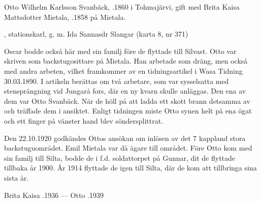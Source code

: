 Otto Wilhelm Karlsson Svanbäck, .1860 i Tohmajärvi, gift med Brita Kaisa Mattsdotter Mietala, .1858 på Mietala.
\begin{jhchildren}
  \item {}
  \item {}
  \item {}
  \item {}
  \item {}, stationskarl, g. m. Ida Sannasdr Slangar (karta 8, nr 371)
  \item {}
  \item {}
  \item {}
  \item {}
\end{jhchildren}

Oscar bodde också här med sin familj före de flyttade till Silvast. Otto var skriven som backstugosittare på Mietala. Han arbetade som dräng, men också med andra arbeten, vilket framkommer av en tidningsartikel i Wasa Tidning 30.03.1890. I artikeln berättas om två arbetare, som var sysselsatta med stensprängning vid Jungarå fors, där en ny kvarn skulle anläggas. Den ena av dem var Otto Svanbäck. När de höll på att ladda ett skott brann detsamma av och träffade dem i ansiktet. Enligt tidningen miste Otto synen helt på ena ögat och ett finger på vänster hand blev söndersplittrat.

Den 22.10.1920 godkändes Ottos ansökan om inlösen av det 7 kappland stora backstuguområdet. Emil Mietala var då ägare till området. Före Otto kom med sin familj till Silta, bodde de i f.d. soldattorpet på Gunnar, dit de flyttade tillbaka år 1900. År 1914 flyttade de igen till Silta, där de kom att tillbringa sina sista år.

Brita Kaisa .1936  ---  Otto .1939


